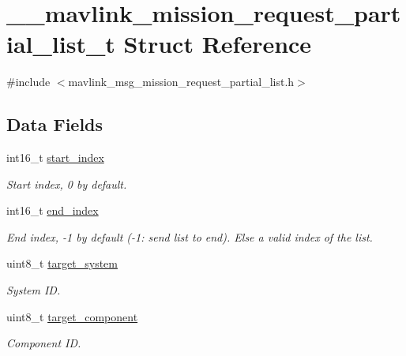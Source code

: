 \hypertarget{struct____mavlink__mission__request__partial__list__t}{\section{\+\_\+\+\_\+mavlink\+\_\+mission\+\_\+request\+\_\+partial\+\_\+list\+\_\+t Struct Reference}
\label{struct____mavlink__mission__request__partial__list__t}
}


{\ttfamily \#include $<$mavlink\+\_\+msg\+\_\+mission\+\_\+request\+\_\+partial\+\_\+list.\+h$>$}

\subsection*{Data Fields}
\begin{DoxyCompactItemize}
\item 
int16\+\_\+t \hyperlink{struct____mavlink__mission__request__partial__list__t_aa88d56cd8a892b8416b49a6e0ec9b5cf}{start\+\_\+index}
\begin{DoxyCompactList}\small\item\em Start index, 0 by default. \end{DoxyCompactList}\item 
int16\+\_\+t \hyperlink{struct____mavlink__mission__request__partial__list__t_a9e484b80b2b8a0ced10f414e2d6c2636}{end\+\_\+index}
\begin{DoxyCompactList}\small\item\em End index, -\/1 by default (-\/1\+: send list to end). Else a valid index of the list. \end{DoxyCompactList}\item 
uint8\+\_\+t \hyperlink{struct____mavlink__mission__request__partial__list__t_aa4ec7ce5b44a621b414861aa5e575cc6}{target\+\_\+system}
\begin{DoxyCompactList}\small\item\em System I\+D. \end{DoxyCompactList}\item 
uint8\+\_\+t \hyperlink{struct____mavlink__mission__request__partial__list__t_abc11feeb766eb42c7eadff5850284cd2}{target\+\_\+component}
\begin{DoxyCompactList}\small\item\em Component I\+D. \end{DoxyCompactList}\end{DoxyCompactItemize}


